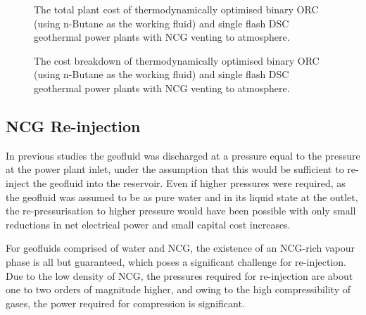         \begin{figure}[H]
            \centering
            
            \caption{The total plant cost of thermodynamically optimised binary \ac{ORC} (using n-Butane as the working fluid) and single flash \ac{DSC} geothermal power plants with \ac{NCG} venting to atmosphere.}
            \label{fig:prosim_NCG_Ventilation_Cost}
        \end{figure}

        \begin{figure}[H]
            \centering
            
            \caption{The cost breakdown of thermodynamically optimised binary \ac{ORC} (using n-Butane as the working fluid) and single flash \ac{DSC} geothermal power plants with \ac{NCG} venting to atmosphere.}
            \label{fig:prosim_NCG_Ventilation_CostBreakdown}
        \end{figure}

\subsection{NCG Re-injection}
    In previous studies the geofluid was discharged at a pressure equal to the pressure at the power plant inlet, under the assumption that this would be sufficient to re-inject the geofluid into the reservoir. Even if higher pressures were required, as the geofluid was assumed to be as pure water and in its liquid state at the outlet, the re-pressurisation to higher pressure would have been possible with only small reductions in net electrical power and small capital cost increases.

    For geofluids comprised of water and \ac{NCG}, the existence of an \ac{NCG}-rich vapour phase is all but guaranteed, which poses a significant challenge for re-injection. Due to the low density of \ac{NCG}, the pressures required for re-injection are about one to two orders of magnitude higher, and owing to the high compressibility of gases, the power required for compression is significant.

